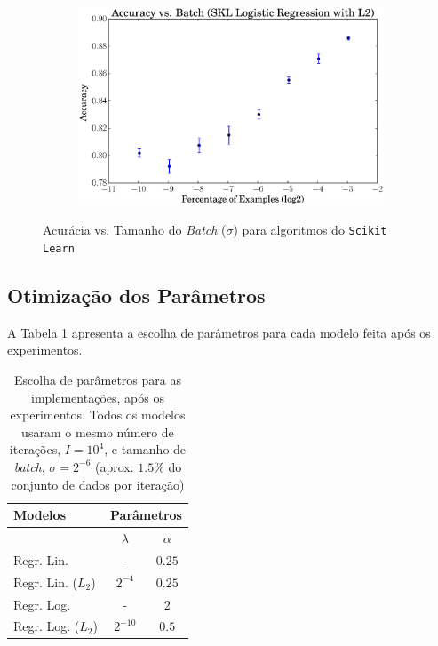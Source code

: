 \documentclass[a4paper, 12pt]{article}
\begin{document}
\begin{figure}[htpb]
\begin{subfigure}[htpb]{0.45\textwidth}
        \includegraphics[width=\textwidth]{acc_vs_batchp_skl_logregL2}
        \caption{}
        \label{fig:batch_skl_logregL2}
    \end{subfigure}
    \caption{Acurácia vs. Tamanho do \textit{Batch} ($\sigma$)
    para algoritmos do \texttt{Scikit Learn}}\label{fig:batch_skl}
\end{figure}

\newpage
\subsection{Otimização dos Parâmetros}

A Tabela \ref{tab:par} apresenta a escolha de parâmetros para cada
modelo feita após os experimentos.

\begin{table}[htpb]
    \centering
    \begin{tabular}{@{}lcc@{}}
        \textbf{Modelos} & \multicolumn{2}{c}{\textbf{Parâmetros}} \\ \toprule
        & $\lambda$ & $\alpha$ \\ \midrule
        Regr. Lin. & - & $0.25$ \\
        Regr. Lin. ($L_2$) & $2^{-4}$ & $0.25 $       \\
        Regr. Log. & - & $2$ \\
        Regr. Log. ($L_2$) & $2^{-10}$ & $0.5$ \\ \bottomrule
    \end{tabular}
    \caption{Escolha de parâmetros para as implementações, após os
    experimentos. Todos os modelos usaram o mesmo número de iterações,
    $I = 10^{4}$, e tamanho de \textit{batch}, $\sigma = 2^{-6}$ (aprox.
    $1.5\%$ do conjunto de dados por iteração)}
    \label{tab:par}
\end{table}
\end{document}
